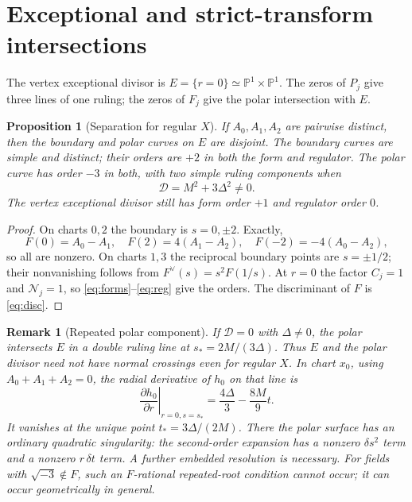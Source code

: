 \documentclass[12pt,letterpaper]{amsart}
\newtheorem{proposition}[theorem]{Proposition}
\newtheorem{remark}[theorem]{Remark}
\begin{document}
\section{Exceptional and strict-transform intersections}
The vertex exceptional divisor is $E=\{r=0\}\simeq\mathbb P^1\times\mathbb P^1$. The zeros of $P_j$ give three lines of one ruling; the zeros of $F_j$ give the polar intersection with $E$.
\begin{proposition}[Separation for regular $X$]\label{prop:separation}
If $A_0,A_1,A_2$ are pairwise distinct, then the boundary and polar curves on $E$ are disjoint. The boundary curves are simple and distinct; their orders are $+2$ in both the form and regulator. The polar curve has order $-3$ in both, with two simple ruling components when
\begin{equation}\label{eq:disc}
\mathscr D=M^2+3\Delta^2\ne0.
\end{equation}
The vertex exceptional divisor still has form order $+1$ and regulator order $0$.
\end{proposition}
\begin{proof}
On charts $0,2$ the boundary is $s=0,\pm2$. Exactly,
\[F(0)=A_0-A_1,\quad F(2)=4(A_1-A_2),\quad F(-2)=-4(A_0-A_2),\]
so all are nonzero. On charts $1,3$ the reciprocal boundary points are $s=\pm1/2$; their nonvanishing follows from $F^\vee(s)=s^2F(1/s)$. At $r=0$ the factor $C_j=1$ and $\mathcal N_j=1$, so \eqref{eq:forms}--\eqref{eq:reg} give the orders. The discriminant of $F$ is \eqref{eq:disc}.
\end{proof}
\begin{remark}[Repeated polar component]\label{rem:double}
If $\mathscr D=0$ with $\Delta\ne0$, the polar intersects $E$ in a \emph{double} ruling line at $s_*=2M/(3\Delta)$. Thus $E$ and the polar divisor need not have normal crossings even for regular $X$. In chart $x_0$, using $A_0+A_1+A_2=0$, the radial derivative of $h_0$ on that line is
\[
\left.\frac{\partial h_0}{\partial r}\right|_{r=0,s=s_*}
 =\frac{4\Delta}{3}-\frac{8M}{9}t.
\]
It vanishes at the unique point $t_*=3\Delta/(2M)$. There the polar surface has an ordinary quadratic singularity: the second-order expansion has a nonzero $\delta s^2$ term and a nonzero $r\,\delta t$ term. A further embedded resolution is necessary. For fields with $\sqrt{-3}\notin F$, such an $F$-rational repeated-root condition cannot occur; it can occur geometrically in general.
\end{remark}
\end{document}
